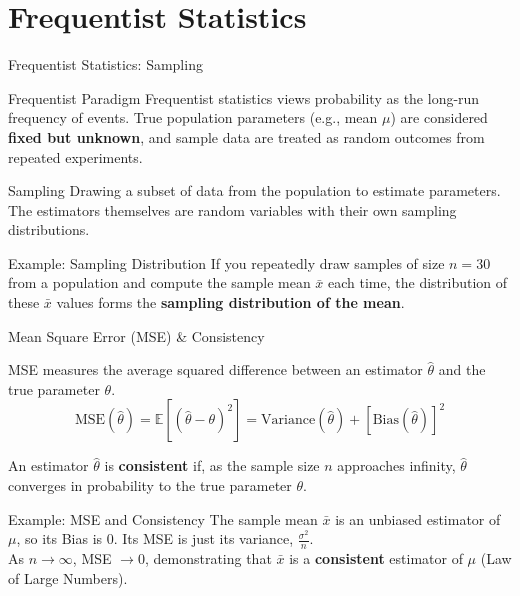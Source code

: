 \documentclass[10pt, aspectratio=169]{beamer}
\begin{document}
\section{Frequentist Statistics}

\begin{frame}{Frequentist Statistics: Sampling}
    \begin{block}{Frequentist Paradigm}
        Frequentist statistics views probability as the long-run frequency of events. True population parameters (e.g., mean $\mu$) are considered \textbf{fixed but unknown}, and sample data are treated as random outcomes from repeated experiments.
    \end{block}

    \begin{block}{Sampling}
        Drawing a subset of data from the population to estimate parameters. The estimators themselves are random variables with their own sampling distributions.
    \end{block}

    \begin{exampleblock}{Example: Sampling Distribution}
        If you repeatedly draw samples of size $n=30$ from a population and compute the sample mean $\bar{x}$ each time, the distribution of these $\bar{x}$ values forms the \textbf{sampling distribution of the mean}.
    \end{exampleblock}
\end{frame}

\begin{frame}{Mean Square Error (MSE) \& Consistency}
    \begin{definition}
        MSE measures the average squared difference between an estimator $\hat{\theta}$ and the true parameter $\theta$.
        $$\text{MSE}(\hat{\theta}) = \mathbb{E}[(\hat{\theta} - \theta)^2] = \text{Variance}(\hat{\theta}) + [\text{Bias}(\hat{\theta})]^2$$
    \end{definition}

    \begin{definition}[Consistency]
        An estimator $\hat{\theta}$ is \textbf{consistent} if, as the sample size $n$ approaches infinity, $\hat{\theta}$ converges in probability to the true parameter $\theta$.
    \end{definition}

    \begin{exampleblock}{Example: MSE and Consistency}
        The sample mean $\bar{x}$ is an unbiased estimator of $\mu$, so its Bias is $0$. Its MSE is just its variance, $\frac{\sigma^2}{n}$. \\
        As $n \to \infty$, MSE $\to 0$, demonstrating that $\bar{x}$ is a \textbf{consistent} estimator of $\mu$ (Law of Large Numbers).
    \end{exampleblock}
\end{frame}
\end{document}
